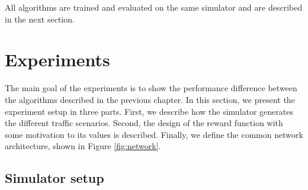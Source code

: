 All algorithms are trained and evaluated on the same simulator and are described in the next section. 

%         

\section{Experiments}
\label{sec:experiments}
The main goal of the experiments is to show the performance difference between the algorithms described in the previous chapter. 
In this section, we present the experiment setup in three parts. First, we describe how the simulator generates the different traffic scenarios. Second, the design of the reward function with some motivation to its values is described. Finally, we define the common network architecture, shown in Figure \ref{fig:network}.

\subsection{Simulator setup}
\label{sec:simulation_setup}



